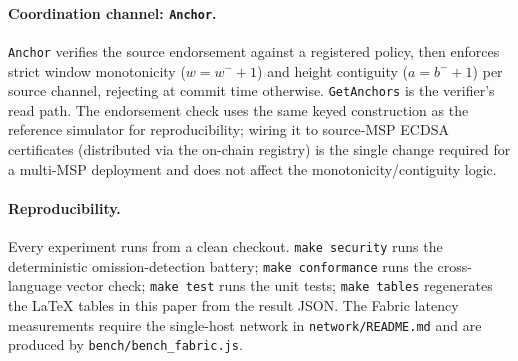\paragraph{Coordination channel: \texttt{Anchor}.}
\texttt{Anchor} verifies the source endorsement against a registered policy,
then enforces strict window monotonicity ($w=w^-{+}1$) and height contiguity
($a=b^-{+}1$) per source channel, rejecting at commit time otherwise.
\texttt{GetAnchors} is the verifier's read path. The endorsement check uses the
same keyed construction as the reference simulator for reproducibility; wiring
it to source-MSP ECDSA certificates (distributed via the on-chain registry) is
the single change required for a multi-MSP deployment and does not affect the
monotonicity/contiguity logic.

\paragraph{Reproducibility.}
Every experiment runs from a clean checkout. \texttt{make security} runs the
deterministic omission-detection battery; \texttt{make conformance} runs the
cross-language vector check; \texttt{make test} runs the unit tests;
\texttt{make tables} regenerates the LaTeX tables in this paper from the result
JSON. The Fabric latency measurements require the single-host network in
\texttt{network/README.md} and are produced by \texttt{bench/bench\_fabric.js}.

